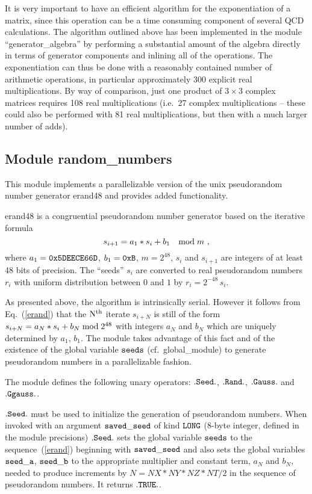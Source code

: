 It is very important to have an efficient algorithm for the
exponentiation of a matrix, since this operation can be a time
consuming component of several QCD calculations. The algorithm
outlined above has been implemented in the module
``generator\_algebra'' by performing a substantial amount of the
algebra directly in terms of generator components and inlining all of
the operations.  The exponentiation can thus be done with a
reasonably contained number of arithmetic operations, in particular
approximately 300 explicit real multiplications. By way of
comparison, just one product of $3 \times 3$ complex matrices requires
108 real multiplications (i.e.~27 complex multiplications -- these could
also be performed with 81 real multiplications, but then with a much larger
number of adds).

\subsection{Module random\_numbers}
\label{randomnumbers}

This module implements a parallelizable version of the unix pseudorandom
number generator erand48 and provides added functionality.

erand48 is a congruential pseudorandom number generator based on the
iterative formula
%
\begin{equation}
s_{i+1}=a_1*s_i+b_1 \quad {\rm mod} \; m \ ,
\label{erand}
\end{equation}
%
where $a_1=\tt 0x5DEECE66D$, $b_1=\tt 0xB$, $m=2^{48}$, $s_i$ 
and $s_{i+1}$ are integers of at least 48 bits of precision.  
The ``seeds'' $s_i$ are converted
to real pseudorandom numbers $r_i$ with uniform distribution 
between $0$ and $1$ by $r_i=2^{-48}\, s_i$.

As presented above, the algorithm is intrinsically serial. However it
follows from Eq.~(\ref{erand}) that the $\rm N^{th}$ iterate $s_{i+N}$
is still of the form $s_{i+N}=a_N*s_i+b_N \; {\rm mod} \; 2^{48}$ 
with integers
$a_N$ and $b_N$ which are uniquely determined by $a_1$, $b_1$.
The module takes advantage of this fact and of the existence of
the global variable $\tt seeds$ (cf.~global\_module) to generate 
pseudorandom numbers in a parallelizable fashion.  

The module defines the following unary operators: $\tt .Seed.$,
$\tt .Rand.$, $\tt .Gauss.$ and $\tt .Ggauss.$.

$\tt .Seed.$ must be used to initialize the generation of pseudorandom
numbers.  When invoked with an argument $\tt saved\_seed$ of kind
$\tt LONG$ (8-byte integer, defined in the module precisions)
$\tt .Seed.$ sets the global variable $\tt seeds$ to the 
sequence~(\ref{erand})
beginning with $\tt saved\_seed$ and also sets the global variables 
$\tt seed\_a$, $\tt seed\_b$ to the appropriate multiplier and constant 
term, $a_N$ and $b_N$, needed to produce increments by $N=NX*NY*NZ*NT/2$ 
in the sequence of pseudorandom numbers.  It returns $\tt .TRUE.$.

